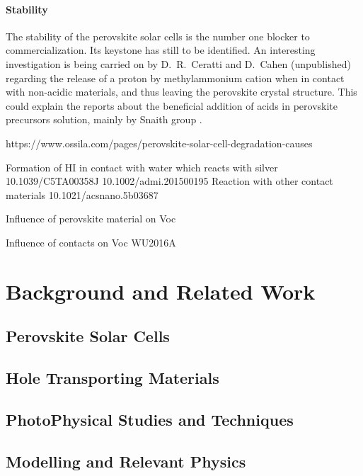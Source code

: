 	\paragraph{Stability}
	The stability of the perovskite solar cells is the number one blocker to commercialization.
	Its keystone has still to be identified.
	An interesting investigation is being carried on by D.\ R.\ Ceratti and D.\ Cahen (unpublished) regarding the release of a proton by methylammonium cation when in contact with non-acidic materials, and thus leaving the perovskite crystal structure.
	This could explain the reports about the beneficial addition of acids in perovskite precursors solution, mainly by Snaith group \cite{Noel2017,Zhang2015a,Nayak2016}.


	https://www.ossila.com/pages/perovskite-solar-cell-degradation-causes


Formation of HI in contact with water which reacts with silver 10.1039/C5TA00358J 10.1002/admi.201500195
Reaction with other contact materials 10.1021/acsnano.5b03687

	Influence of perovskite material on Voc \cite{Wheeler2017,Eperon2014,Noh2013a}

	Influence of contacts on Voc \cite{CorreaBaena2015} WU2016A

\section{Background and Related Work}\label{sec:background}

	\subsection{Perovskite Solar Cells}

	\subsection{Hole Transporting Materials}

	\subsection{PhotoPhysical Studies and Techniques}

	\subsection{Modelling and Relevant Physics}
